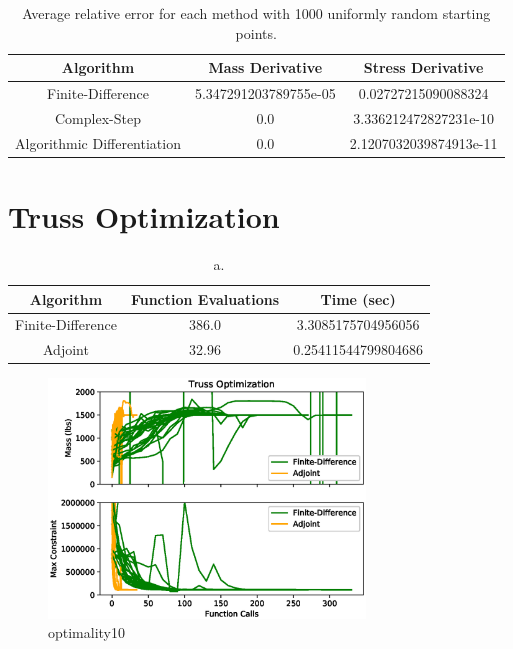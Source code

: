\documentclass{article}
\begin{document}
\begin{table}[htb]
	\centering
	\caption{Average relative error for each method with 1000 uniformly random starting points.}
	\label{tab:comp_der}
	\begin{tabular}{c|c|c}
		\toprule
		Algorithm & Mass Derivative & Stress Derivative \\
		\midrule
		Finite-Difference & 5.347291203789755e-05 & 0.02727215090088324 \\
		Complex-Step  & 0.0 & 3.336212472827231e-10 \\
		Algorithmic Differentiation & 0.0 & 2.1207032039874913e-11 \\
		\bottomrule
	\end{tabular}
\end{table}

\section*{Truss Optimization}

\begin{table}[htb]
	\centering
	\caption{a.}
	\label{tab:c}
	\begin{tabular}{c|c|c}
		\toprule
		Algorithm & Function Evaluations & Time (sec) \\
		\midrule
		Finite-Difference & 386.0 & 3.3085175704956056\\
		Adjoint & 32.96 & 0.25411544799804686 \\
		\bottomrule
	\end{tabular}
\end{table}

\begin{figure}[htbp]
	\centering

	\includegraphics[width=0.75\textwidth]{optimality10.eps}

	\caption{optimality10}
	\label{fig:opt10}
\end{figure}






\end{document}
